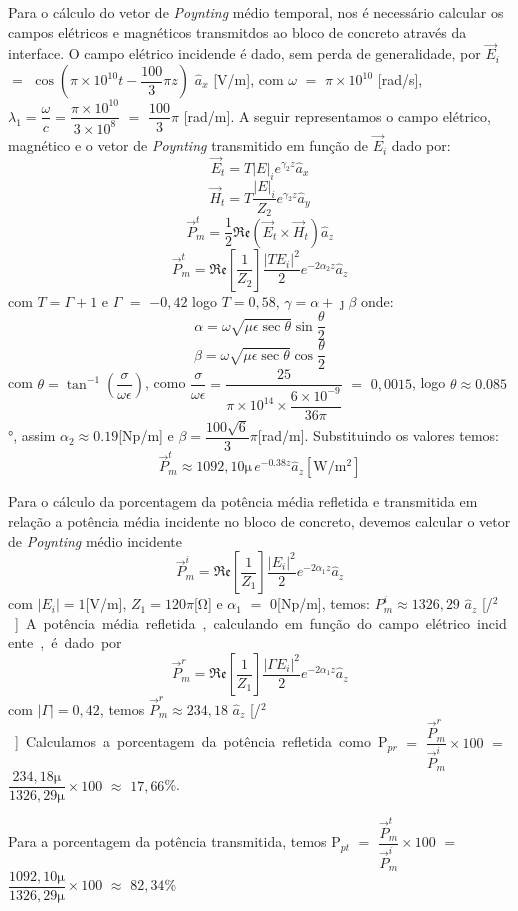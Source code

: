\begin{enumerate}[1.]
Para o cálculo do vetor de \emph{Poynting} médio temporal, nos é necessário calcular os campos elétricos e magnéticos transmitdos ao bloco de concreto através da interface.  O campo elétrico incidende é dado, sem perda de generalidade, por $\vec{E}_{i}$ $=$ $\cos(\pi \times 10^{10} t - \dfrac{100}{3}\pi z)$ $\hat{a}_{x}$ [\si{\volt/\meter}], com $\omega$ $=$ $\pi \times 10^{10}$ [\si{\radian/\second}], $\lambda_{1} = \dfrac{\omega}{c} = \dfrac{\pi \times 10^{10}}{3 \times 10^{8}}$ $=$ $\dfrac{100}{3}\pi$ [\si{\radian/\meter}]. A seguir representamos o  campo elétrico, magnético e o vetor de \emph{Poynting} transmitido em função de $\vec{E}_{i}$ dado por: $$\vec{E}_{t}  =  T |E|_{i} e^{\gamma_{2} z} \hat{a}_{x}$$ $$\vec{H}_{t}  =  T \dfrac{|E|_{i}}{Z_{2}} e^{\gamma_{2} z} \hat{a}_{y}$$ $$\vec{P}_{m}^{t} = \dfrac{1}{2}\mathfrak{Re}(\vec{E}_{t} \times \vec{H}_{t}) \hat{a}_{z}$$ $$\vec{P}_{m}^{t} = \mathfrak{Re}\left[\dfrac{1}{Z_{2}}\right] \dfrac{|T E_{i}|^2}{2}e^{-2\alpha_{2} z} \hat{a}_{z}$$ com $T = \Gamma + 1$ e $\Gamma$ $=$ $-0,42$ logo $T = 0,58$, $\gamma = \alpha + \jmath \beta$  onde: $$\alpha = \omega \sqrt{\mu\epsilon \sec{\theta}} \sin{\dfrac{\theta}{2}}$$ $$\beta = \omega \sqrt{\mu\epsilon \sec{\theta}} \cos{\dfrac{\theta}{2}}$$ com $\theta = \tan^{-1}\left(\dfrac{\sigma}{\omega\epsilon}\right)$, como $\dfrac{\sigma}{\omega\epsilon} = \dfrac{25}{\pi \times 10^{14} \times \dfrac{6 \times 10^{-9}}{36\pi}}$ $=$ $0,0015$, logo $\theta \approx 0.085$\si{\degree}, assim $\alpha_{2} \approx 0.19$[\si{\neper/\meter}] e $\beta = \dfrac{100\sqrt{6}}{3}\pi$[\si{\radian/\meter}]. Substituindo os valores temos: $$\vec{P}_{m}^{t} \approx 1092,10 \si{\micro} \, e^{-0.38 z} \hat{a}_{z}[\si{\watt/\meter^{2}}]$$

Para o cálculo da porcentagem da potência média refletida e transmitida em relação a potência média incidente no bloco de concreto, devemos calcular o vetor de \emph{Poynting} médio incidente $$\vec{P}_{m}^{i} = \mathfrak{Re}\left[\dfrac{1}{Z_{1}}\right] \dfrac{|E_{i}|^2}{2}e^{-2\alpha_{1} z} \hat{a}_{z}$$ com $|E_i| = 1$[\si{\volt/\meter}], $Z_{1} = 120\pi$[\si{\ohm}] e $\alpha_{1}$ $=$ $0$[\si{\neper/\meter}], temos: $P_{m}^{i} \approx 1326,29$\si{\micro} $\hat{a}_{z}$ [\si{\watt/\meter$^2$}]. A potência média refletida, calculando em função do campo elétrico incidente, é dado por $$\vec{P}_{m}^{r} = \mathfrak{Re}\left[\dfrac{1}{Z_{1}}\right] \dfrac{|\Gamma E_{i}|^2}{2}e^{-2\alpha_{1} z} \hat{a}_{z}$$ com $|\Gamma| = 0,42$, temos $\vec{P}_{m}^{r} \approx 234,18$\si{\micro} $\hat{a}_{z}$ [\si{\watt/\meter$^2$}].

Calculamos a porcentagem da potência refletida como P$_{pr}$ $=$ $\dfrac{\vec{P}_{m}^{r}}{\vec{P}_{m}^{i}} \times 100$ $=$ $\dfrac{234,18 \si{\micro}}{1326,29 \si{\micro}} \times 100$ $\approx$ $17,66$\%.

Para a porcentagem da potência transmitida, temos P$_{pt}$ $=$ $\dfrac{\vec{P}_{m}^{t}}{\vec{P}_{m}^{i}} \times 100$ $=$ $\dfrac{1092,10 \si{\micro}}{1326,29 \si{\micro}} \times 100$ $\approx$ $82,34$\%
\end{enumerate}
 

